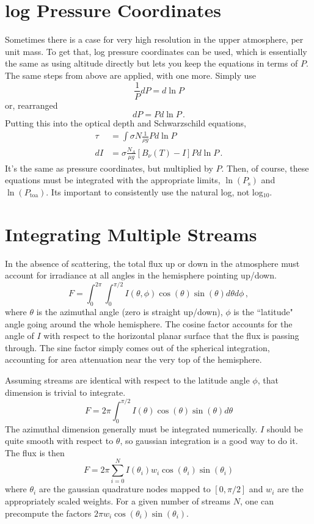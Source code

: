 \documentclass[10pt]{article}
\begin{document}
\section*{log Pressure Coordinates}

Sometimes there is a case for very high resolution in the upper atmosphere, per unit mass. To get that, log pressure coordinates can be used, which is essentially the same as using altitude directly but lets you keep the equations in terms of $P$. The same steps from above are applied, with one more. Simply use
\begin{equation}
	\frac{1}{P} dP = d\ln P
\end{equation}
or, rearranged
\begin{equation}
	dP = P d\ln P \, .
\end{equation}
Putting this into the optical depth and Schwarzschild equations,
\begin{align}
	\tau	 &= \int \sigma N \frac{1}{\rho g} P d\ln P \\[1em]
	dI &= \sigma	\frac{N_A}{\mu g} [B_{\nu}(T) - I] P d\ln P \, .
\end{align}
It's the same as pressure coordinates, but multiplied by $P$. Then, of course, these equations must be integrated with the appropriate limits, $\ln(P_{\textrm{s}})$ and $\ln(P_{\textrm{toa}})$. Its important to consistently use the natural log, not log$_{10}$.

\section*{Integrating Multiple Streams}

In the absence of scattering, the total flux up or down in the atmosphere must account for irradiance at all angles in the hemisphere pointing up/down.
\begin{equation}
	F = \int_0^{2\pi} \int_0^{\pi/2} I(\theta	,\phi) \cos(\theta) \sin(\theta) d\theta d\phi \, ,
\end{equation}
where $\theta$ is the azimuthal angle (zero is straight up/down), $\phi$ is the ``latitude" angle going around the whole hemisphere. The cosine factor accounts for the angle of $I$ with respect to the horizontal planar surface that the flux is passing through. The sine factor simply comes out of the spherical integration, accounting for area attenuation near the very top of the hemisphere.

Assuming streams are identical with respect to the latitude angle $\phi$, that dimension is trivial to integrate.
\begin{equation}
	F = 2\pi	 \int_0^{\pi/2} I(\theta) \cos(\theta) \sin(\theta) d\theta
\end{equation}
The azimuthal dimension generally must be integrated numerically. $I$ should be quite smooth with respect to $\theta$, so gaussian integration is a good way to do it. The flux is then
\begin{equation}
	F = 2\pi \sum_{i=0}^N I(\theta_i) w_i \cos(\theta_i) \sin(\theta_i)
\end{equation}
where $\theta_i$ are the gaussian quadrature nodes mapped to $[0,\pi/2]$ and $w_i$ are the appropriately scaled weights. For a given number of streams $N$, one can precompute the factors $2\pi w_i \cos(\theta_i) \sin(\theta_i)$.
\end{document}
